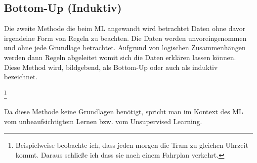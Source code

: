\documentclass[12pt,german,ngerman]{report}
\begin{document}
    \subsection{Bottom-Up (Induktiv)}
        Die zweite Methode die beim ML angewandt wird betrachtet Daten ohne davor irgendeine Form von Regeln zu beachten.  
        Die Daten werden unvoreingenommen und ohne jede Grundlage betrachtet.
        Aufgrund von logischen Zusammenhängen werden dann Regeln abgeleitet womit sich die Daten erklären lassen können.
        Diese Method wird, bildgebend, als Bottom-Up oder auch als induktiv\cite{dundi2021unileipzig} bezeichnet.
        
        \footnote{Beispielweise beobachte ich, dass jeden morgen die Tram zu gleichen Uhrzeit kommt. Daraus schließe ich 
        dass sie nach einem Fahrplan verkehrt.}

        Da diese Methode keine Grundlagen benötigt, spricht man
        im Kontext des ML vom unbeaufsichtigtem Lernen bzw. vom Unsupervised Learning.
\end{document}
